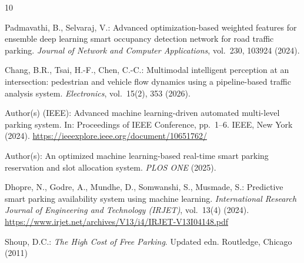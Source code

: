 \documentclass[runningheads]{llncs}
\begin{document}
\begin{thebibliography}{10}

Padmavathi, B., Selvaraj, V.: Advanced optimization-based
weighted features for ensemble deep learning smart occupancy
detection network for road traffic parking.
\textit{Journal of Network and Computer Applications},
vol.~230, 103924 (2024).

Chang, B.R., Tsai, H.-F., Chen, C.-C.: Multimodal intelligent
perception at an intersection: pedestrian and vehicle flow
dynamics using a pipeline-based traffic analysis system.
\textit{Electronics}, vol.~15(2), 353 (2026).

Author(s) (IEEE): Advanced machine learning-driven automated
multi-level parking system. In: Proceedings of IEEE
Conference, pp.~1--6. IEEE, New York (2024).
\url{https://ieeexplore.ieee.org/document/10651762/}

Author(s): An optimized machine learning-based real-time
smart parking reservation and slot allocation system.
\textit{PLOS ONE} (2025).

Dhopre, N., Godre, A., Mundhe, D., Somwanshi, S.,
Musmade, S.: Predictive smart parking availability system
using machine learning. \textit{International Research
Journal of Engineering and Technology (IRJET)}, vol.~13(4)
(2024).
\url{https://www.irjet.net/archives/V13/i4/IRJET-V13I04148.pdf}

Shoup, D.C.: \textit{The High Cost of Free Parking}.
Updated edn. Routledge, Chicago (2011)

\end{thebibliography}
\end{document}
